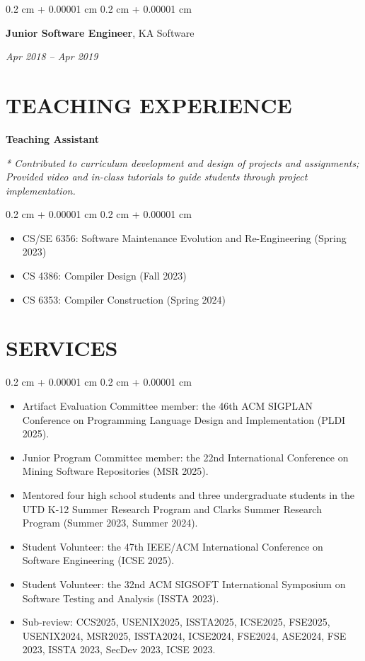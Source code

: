 \documentclass[10pt, letterpaper]{article}
\newenvironment{highlights}{
    \begin{itemize}[
        topsep=0.10 cm,
        parsep=0.10 cm,
        partopsep=0pt,
        itemsep=0pt,
        leftmargin=0.4 cm + 10pt
    ]
}{
    \end{itemize}
} %
\newenvironment{onecolentry}{
    \begin{adjustwidth}{
        0.2 cm + 0.00001 cm
    }{
        0.2 cm + 0.00001 cm
    }
}{
    \end{adjustwidth}
} %
\newenvironment{twocolentry}[2][]{
    \onecolentry
    \def\secondColumn{#2}
    \setcolumnwidth{\fill, 4.5 cm}
    \begin{paracol}{2}
}{
    \switchcolumn \raggedleft \secondColumn
    \end{paracol}
    \endonecolentry
} %
\begin{document}
        \vspace{0.2 cm}

        \begin{twocolentry}{
        \textit{Apr 2018 – Apr 2019}
        }
        
        \textbf{Junior Software Engineer}, KA Software 
        
        \end{twocolentry}

        \vspace{0.2 cm}


    \section{TEACHING EXPERIENCE}
    
    \textbf{Teaching Assistant}
    
    \textit{* Contributed to curriculum development and design of projects and assignments; Provided video and in-class tutorials to guide students through project implementation.}
    
    \begin{onecolentry}
        \begin{highlights}
        \item CS/SE 6356: Software Maintenance Evolution and Re-Engineering (Spring 2023)
        \item CS 4386: Compiler Design (Fall 2023)
        \item CS 6353: Compiler Construction (Spring 2024)
        \end{highlights}
    \end{onecolentry}

    \section{SERVICES}
    \begin{onecolentry}
        \begin{highlights}
        \item Artifact Evaluation Committee member: the 46th ACM SIGPLAN Conference on Programming Language Design and Implementation (PLDI 2025).

        \item Junior Program Committee member: the 22nd International Conference on Mining Software Repositories (MSR 2025).
        \item Mentored four high school students and three undergraduate students in the UTD K-12 Summer Research Program and Clarks Summer Research Program (Summer 2023, Summer 2024).
        \item Student Volunteer: the 47th IEEE/ACM International Conference on Software Engineering (ICSE 2025).
        \item Student Volunteer: the 32nd ACM SIGSOFT International Symposium on Software Testing and Analysis (ISSTA 2023).
        \item Sub-review: CCS2025, USENIX2025, ISSTA2025, ICSE2025, FSE2025, USENIX2024, MSR2025, ISSTA2024, ICSE2024, FSE2024, ASE2024, FSE 2023, ISSTA 2023, SecDev 2023, ICSE 2023.
        \end{highlights}
    \end{onecolentry}
    
\end{document}
